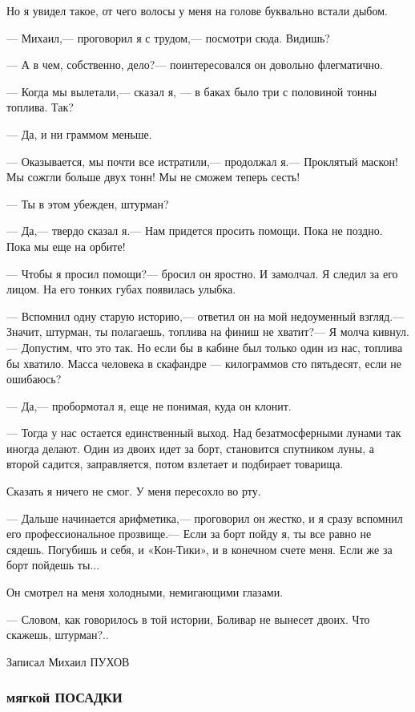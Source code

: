 \documentclass[11pt,a4paper,oneside]{article}
\begin{document}
Но я увидел такое, от чего волосы у меня на голове буквально встали дыбом.

— Михаил,— проговорил я с трудом,— посмотри сюда. Видишь?

— А в чем, собственно, дело?— поинтересовался он довольно флегматично.

— Когда мы вылетали,— сказал я, — в баках было три с половиной тонны топлива. Так?

— Да, и ни граммом меньше.

— Оказывается, мы почти все истратили,— продолжал я.— Проклятый маскон! Мы сожгли больше двух тонн! Мы не сможем теперь сесть!

— Ты в этом убежден, штурман?

— Да,— твердо сказал я.— Нам придется просить помощи. Пока не поздно. Пока мы еще на орбите!

— Чтобы я просил помощи?— бросил он яростно. И замолчал. Я следил за его лицом. На его тонких губах появилась улыбка.

— Вспомнил одну старую историю,— ответил он на мой недоуменный взгляд.— Значит, штурман, ты полагаешь, топлива на финиш не хватит?— Я молча кивнул.— Допустим, что это так. Но если бы в кабине был только один из нас, топлива бы хватило. Масса человека в скафандре — килограммов сто пятьдесят, если не ошибаюсь?

— Да,— пробормотал я, еще не понимая, куда он клонит.

— Тогда у нас остается единственный выход. Над безатмосферными лунами так иногда делают. Один из двоих идет за борт, становится спутником луны, а второй садится, заправляется, потом взлетает и подбирает товарища.

Сказать я ничего не смог. У меня пересохло во рту.

— Дальше начинается арифметика,— проговорил он жестко, и я сразу вспомнил его профессиональное прозвище.— Если за борт пойду я, ты все равно не сядешь. Погубишь и себя, и «Кон-Тики», и в конечном счете меня. Если же за борт пойдешь ты...

Он смотрел на меня холодными, немигающими глазами.

— Словом, как говорилось в той истории, Боливар не вынесет двоих. Что скажешь, штурман?..

Записал Михаил ПУХОВ

\subsubsection{мягкой ПОСАДКИ}
\end{document}
